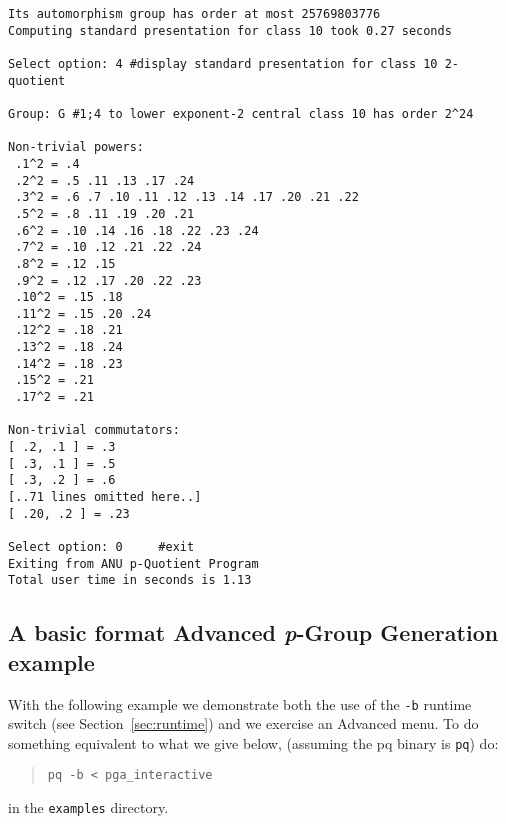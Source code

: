 \documentclass[12pt]{article}
\begin{document}
\begin{verbatim}
Its automorphism group has order at most 25769803776
Computing standard presentation for class 10 took 0.27 seconds

Select option: 4 #display standard presentation for class 10 2-quotient

Group: G #1;4 to lower exponent-2 central class 10 has order 2^24

Non-trivial powers:
 .1^2 = .4
 .2^2 = .5 .11 .13 .17 .24
 .3^2 = .6 .7 .10 .11 .12 .13 .14 .17 .20 .21 .22
 .5^2 = .8 .11 .19 .20 .21
 .6^2 = .10 .14 .16 .18 .22 .23 .24
 .7^2 = .10 .12 .21 .22 .24
 .8^2 = .12 .15
 .9^2 = .12 .17 .20 .22 .23
 .10^2 = .15 .18
 .11^2 = .15 .20 .24
 .12^2 = .18 .21
 .13^2 = .18 .24
 .14^2 = .18 .23
 .15^2 = .21
 .17^2 = .21

Non-trivial commutators:
[ .2, .1 ] = .3
[ .3, .1 ] = .5
[ .3, .2 ] = .6
[..71 lines omitted here..]
[ .20, .2 ] = .23

Select option: 0     #exit
Exiting from ANU p-Quotient Program
Total user time in seconds is 1.13
\end{verbatim}

\subsection{A basic format Advanced {\it p}-Group Generation example}

With the following example we demonstrate both the use of the \texttt{-b}
runtime switch (see Section~\ref{sec:runtime}) and we exercise an
Advanced menu. To do something equivalent to what we give below,
(assuming the pq binary is \texttt{pq}) do:
\begin{quote}
 \verb|pq -b < pga_interactive|
\end{quote}
in the \texttt{examples} directory.
\end{document}
